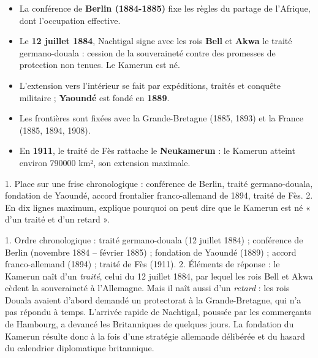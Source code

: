 \documentclass[11pt]{article}
\begin{document}
\begin{aretenir}
\begin{itemize}
\item La conférence de \textbf{Berlin (1884-1885)} fixe les règles du partage de l'Afrique, dont l'occupation effective.
\item Le \textbf{12 juillet 1884}, Nachtigal signe avec les rois \textbf{Bell} et \textbf{Akwa} le traité germano-douala : cession de la souveraineté contre des promesses de protection non tenues. Le Kamerun est né.
\item L'extension vers l'intérieur se fait par expéditions, traités et conquête militaire ; \textbf{Yaoundé} est fondé en \textbf{1889}.
\item Les frontières sont fixées avec la Grande-Bretagne (1885, 1893) et la France (1885, 1894, 1908).
\item En \textbf{1911}, le traité de Fès rattache le \textbf{Neukamerun} : le Kamerun atteint environ \num{790000} km², son extension maximale.
\end{itemize}
\end{aretenir}

\begin{exercice}
1. Place sur une frise chronologique : conférence de Berlin, traité germano-douala, fondation de Yaoundé, accord frontalier franco-allemand de 1894, traité de Fès.
2. En dix lignes maximum, explique pourquoi on peut dire que le Kamerun est né « d'un traité et d'un retard ».
\end{exercice}

\begin{corrige}
1. Ordre chronologique : traité germano-douala (12 juillet 1884) ; conférence de Berlin (novembre 1884 -- février 1885) ; fondation de Yaoundé (1889) ; accord franco-allemand (1894) ; traité de Fès (1911).
2. Éléments de réponse : le Kamerun naît d'un \emph{traité}, celui du 12 juillet 1884, par lequel les rois Bell et Akwa cèdent la souveraineté à l'Allemagne. Mais il naît aussi d'un \emph{retard} : les rois Douala avaient d'abord demandé un protectorat à la Grande-Bretagne, qui n'a pas répondu à temps. L'arrivée rapide de Nachtigal, poussée par les commerçants de Hambourg, a devancé les Britanniques de quelques jours. La fondation du Kamerun résulte donc à la fois d'une stratégie allemande délibérée et du hasard du calendrier diplomatique britannique.
\end{corrige}
\end{document}
